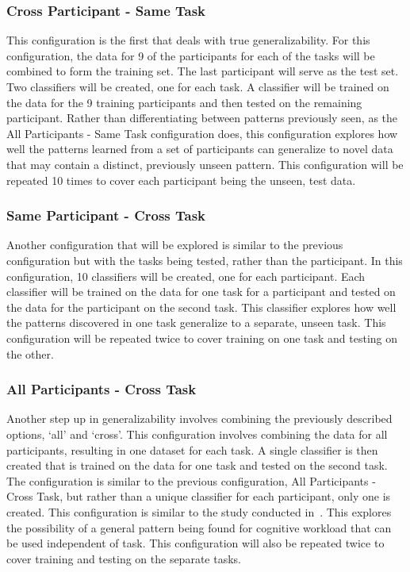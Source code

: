 \documentclass[11pt]{article}
\begin{document}
\subsubsection{Cross Participant - Same Task}
This configuration is the first that deals with true generalizability. For this configuration, the data for 9 of the participants for each of the tasks will be combined to form the training set. The last participant will serve as the test set. Two classifiers will be created, one for each task. A classifier will be trained on the data for the 9 training participants and then tested on the remaining participant. Rather than differentiating between patterns previously seen, as the All Participants - Same Task configuration does, this configuration explores how well the patterns learned from a set of participants can generalize to novel data that may contain a distinct, previously unseen pattern. This configuration will be repeated 10 times to cover each participant being the unseen, test data.

\subsubsection{Same Participant - Cross Task}
Another configuration that will be explored is similar to the previous configuration but with the tasks being tested, rather than the participant. In this configuration, 10 classifiers will be created, one for each participant. Each classifier will be trained on the data for one task for a participant and tested on the data for the participant on the second task. This classifier explores how well the patterns discovered in one task generalize to a separate, unseen task. This configuration will be repeated twice to cover training on one task and testing on the other.

\subsubsection{All Participants - Cross Task}
Another step up in generalizability involves combining the previously described options, `all' and `cross'. This configuration involves combining the data for all participants, resulting in one dataset for each task. A single classifier is then created that is trained on the data for one task and tested on the second task. The configuration is similar to the previous configuration, All Participants - Cross Task, but rather than a unique classifier for each participant, only one is created. This configuration is similar to the study conducted in~\cite{Ke}. This explores the possibility of a general pattern being found for cognitive workload that can be used independent of task. This configuration will also be repeated twice to cover training and testing on the separate tasks.
\end{document}
